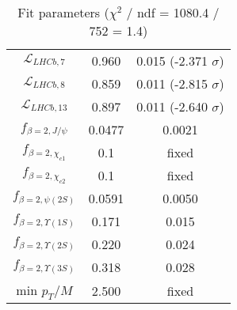 \begin{table}[h!]
\begin{tabular}{c|c|c}
$\mathcal L_{LHCb,7}$ & 0.960 & 0.015 (-2.371 $\sigma$) \\
$\mathcal L_{LHCb,8}$ & 0.859 & 0.011 (-2.815 $\sigma$) \\
$\mathcal L_{LHCb,13}$ & 0.897 & 0.011 (-2.640 $\sigma$) \\
$f_{\beta=2,J/\psi}$ & 0.0477 & 0.0021 \\
$f_{\beta=2,\chi_{c1}}$ & 0.1 & fixed \\
$f_{\beta=2,\chi_{c2}}$ & 0.1 & fixed \\
$f_{\beta=2,\psi(2S)}$ & 0.0591 & 0.0050 \\
$f_{\beta=2,\Upsilon(1S)}$ & 0.171 & 0.015 \\
$f_{\beta=2,\Upsilon(2S)}$ & 0.220 & 0.024 \\
$f_{\beta=2,\Upsilon(3S)}$ & 0.318 & 0.028 \\
min $p_T/M$ & 2.500 & fixed \\
\end{tabular}
\caption{Fit parameters ($\chi^2$ / ndf = 1080.4 / 752 = 1.4)}
\end{table}
